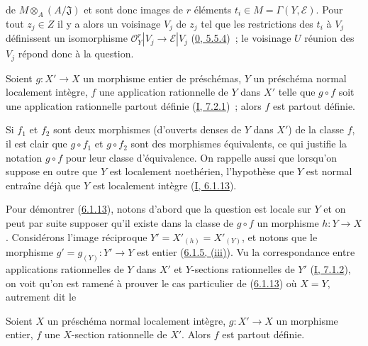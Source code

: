 
de $M\otimes_A(A/\mathfrak{J})$ et sont donc images de $r$ éléments
$t_i\in M=\Gamma(Y,\mathcal{E})$. Pour tout $z_j\in Z$ il y a alors un
voisinage $V_j$ de $z_j$ tel que les restrictions des $t_i$ à $V_j$
définissent un isomorphisme
$\mathcal{O}_Y^r|V_j\to\mathcal{E}|V_j$
(\hyperref[0.5.5.4-fr]{0, 5.5.4})~; le voisinage $U$ réunion des $V_j$ répond
donc à la question.

\begin{proposition}[6.1.13]
\label{II.6.1.13-fr}
Soient $g:X'\to X$ un morphisme entier de préschémas, $Y$ un préschéma normal
localement intègre, $f$ une application rationnelle de $Y$ dans $X'$ telle
que $g\circ f$ soit une application rationnelle partout définie
(\hyperref[I.7.2.1-fr]{I, 7.2.1})~; alors $f$ est partout définie.
\end{proposition}

Si $f_1$ et $f_2$ sont deux morphismes (d'ouverts denses de $Y$ dans $X'$) de
la classe $f$, il est clair que $g\circ f_1$ et $g\circ f_2$ sont des
morphismes équivalents, ce qui justifie la notation $g\circ f$ pour leur
classe d'équivalence. On rappelle aussi que lorsqu'on suppose en outre que
$Y$ est localement noethérien, l'hypothèse que $Y$ est normal entraîne déjà
que $Y$ est localement intègre (\hyperref[I.6.1.13-fr]{I, 6.1.13}).

Pour démontrer (\hyperref[II.6.1.13-fr]{6.1.13}), notons d'abord que la
question est locale sur $Y$ et on peut par suite supposer qu'il existe dans
la classe de $g\circ f$ un morphisme $h:Y\to X$. Considérons l'image
réciproque $Y'=X'_{(h)}=X'_{(Y)}$, et notons que le morphisme
$g'=g_{(Y)}:Y'\to Y$ est entier
(\hyperref[II.6.1.5-fr]{6.1.5, (iii)}). Vu la correspondance entre
applications rationnelles de $Y$ dans $X'$ et $Y$-sections rationnelles de
$Y'$ (\hyperref[I.7.1.2-fr]{I, 7.1.2}), on voit qu'on est ramené à prouver le
cas particulier de (\hyperref[II.6.1.13-fr]{6.1.13}) où $X=Y$, autrement dit
le

\begin{corollary}[6.1.14]
\label{II.6.1.14-fr}
Soient $X$ un préschéma normal localement intègre, $g:X'\to X$ un morphisme
entier, $f$ une $X$-section rationnelle de $X'$. Alors $f$ est partout
définie.
\end{corollary}

